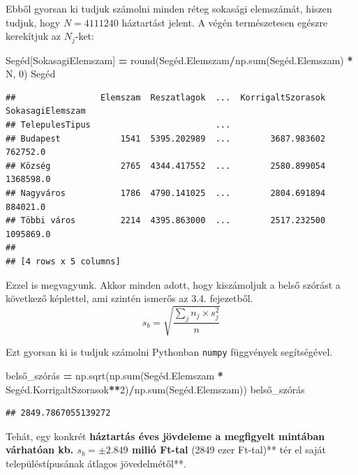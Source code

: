 \documentclass[
]{book}
\newenvironment{Shaded}{\begin{snugshade}}{\end{snugshade}}
\newcommand{\BuiltInTok}[1]{#1}
\newcommand{\DecValTok}[1]{\textcolor[rgb]{0.00,0.00,0.81}{#1}}
\newcommand{\NormalTok}[1]{#1}
\newcommand{\OperatorTok}[1]{\textcolor[rgb]{0.81,0.36,0.00}{\textbf{#1}}}
\newcommand{\StringTok}[1]{\textcolor[rgb]{0.31,0.60,0.02}{#1}}
\begin{document}
Ebből gyorsan ki tudjuk számolni minden réteg sokasági elemszámát, hiszen tudjuk, hogy \(N=4111240\) háztartást jelent. A végén természetesen egészre kerekítjuk az \(N_j\)-ket:

\begin{Shaded}
\begin{Highlighting}[]
\NormalTok{Segéd[}\StringTok{\textquotesingle{}SokasagiElemszam\textquotesingle{}}\NormalTok{] }\OperatorTok{=} \BuiltInTok{round}\NormalTok{(Segéd.Elemszam}\OperatorTok{/}\NormalTok{np.}\BuiltInTok{sum}\NormalTok{(Segéd.Elemszam) }\OperatorTok{*}\NormalTok{ N, }\DecValTok{0}\NormalTok{)}
\NormalTok{Segéd}
\end{Highlighting}
\end{Shaded}

\begin{verbatim}
##                 Elemszam  Reszatlagok  ...  KorrigaltSzorasok  SokasagiElemszam
## TelepulesTipus                         ...                                     
## Budapest            1541  5395.202989  ...        3687.983602          762752.0
## Község              2765  4344.417552  ...        2580.899054         1368598.0
## Nagyváros           1786  4790.141025  ...        2804.691894          884021.0
## Többi város         2214  4395.863000  ...        2517.232500         1095869.0
## 
## [4 rows x 5 columns]
\end{verbatim}

Ezzel is megvagyunk. Akkor minden adott, hogy kiszámoljuk a belső szórást a következő képlettel, ami szintén ismerős az 3.4. fejezetből. \[s_b=\sqrt{\frac{\sum_j{n_j \times s_j^2}}{n}}\]

Ezt gyorsan ki is tudjuk számolni Pythonban \texttt{numpy} függvények segítségével.

\begin{Shaded}
\begin{Highlighting}[]
\NormalTok{belső\_szórás }\OperatorTok{=}\NormalTok{ np.sqrt(np.}\BuiltInTok{sum}\NormalTok{(Segéd.Elemszam }\OperatorTok{*}\NormalTok{ Segéd.KorrigaltSzorasok}\OperatorTok{**}\DecValTok{2}\NormalTok{)}\OperatorTok{/}\NormalTok{np.}\BuiltInTok{sum}\NormalTok{(Segéd.Elemszam))}
\NormalTok{belső\_szórás}
\end{Highlighting}
\end{Shaded}

\begin{verbatim}
## 2849.7867055139272
\end{verbatim}

Tehát, egy konkrét \textbf{háztartás éves jövdeleme a megfigyelt mintában várhatóan kb. \(s_b=\pm 2.849\) milió Ft-tal }(2849 ezer Ft-tal)** tér el saját településtípusának átlagos jövedelmétől**.
\end{document}
